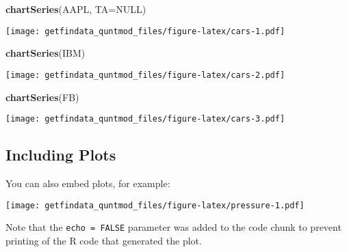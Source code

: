 \documentclass[]{article}
\newenvironment{Shaded}{\begin{snugshade}}{\end{snugshade}}
\newcommand{\DataTypeTok}[1]{\textcolor[rgb]{0.13,0.29,0.53}{#1}}
\newcommand{\KeywordTok}[1]{\textcolor[rgb]{0.13,0.29,0.53}{\textbf{#1}}}
\newcommand{\NormalTok}[1]{#1}
\newcommand{\OtherTok}[1]{\textcolor[rgb]{0.56,0.35,0.01}{#1}}
\begin{document}
\begin{Shaded}
\begin{Highlighting}[]
\KeywordTok{chartSeries}\NormalTok{(AAPL, }\DataTypeTok{TA=}\OtherTok{NULL}\NormalTok{)}
\end{Highlighting}
\end{Shaded}

\texttt{[image: getfindata\_quntmod\_files/figure-latex/cars-1.pdf]}

\begin{Shaded}
\begin{Highlighting}[]
\KeywordTok{chartSeries}\NormalTok{(IBM)}
\end{Highlighting}
\end{Shaded}

\texttt{[image: getfindata\_quntmod\_files/figure-latex/cars-2.pdf]}

\begin{Shaded}
\begin{Highlighting}[]
\KeywordTok{chartSeries}\NormalTok{(FB)}
\end{Highlighting}
\end{Shaded}

\texttt{[image: getfindata\_quntmod\_files/figure-latex/cars-3.pdf]}

\hypertarget{including-plots}{%
\subsection{Including Plots}\label{including-plots}}

You can also embed plots, for example:

\texttt{[image: getfindata\_quntmod\_files/figure-latex/pressure-1.pdf]}

Note that the \texttt{echo\ =\ FALSE} parameter was added to the code
chunk to prevent printing of the R code that generated the plot.
\end{document}

